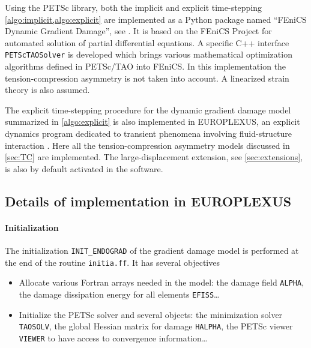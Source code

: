 Using the PETSc library, both the implicit and explicit time-stepping \cref{algo:implicit,algo:explicit} are implemented as a Python package named ``FEniCS Dynamic Gradient Damage'', see \cite{LiMaurini:2015}. It is based on the FEniCS Project \cite{LoggMardalWells:2012} for automated solution of partial differential equations. A specific C++ interface \texttt{PETScTAOSolver} is developed which brings various mathematical optimization algorithms defined in PETSc/TAO into FEniCS. In this implementation the tension-compression asymmetry is not taken into account. A linearized strain theory is also assumed.

The explicit time-stepping procedure for the dynamic gradient damage model summarized in \cref{algo:explicit} is also implemented in EUROPLEXUS, an explicit dynamics program dedicated to transient phenomena involving fluid-structure interaction \cite{EPX:2015}. Here all the tension-compression asymmetry models discussed in \cref{sec:TC} are implemented. The large-displacement extension, see \cref{sec:extensions}, is also by default activated in the software.

\subsection{Details of implementation in EUROPLEXUS}

\paragraph{Initialization}
The initialization \texttt{INIT\_ENDOGRAD} of the gradient damage model is performed at the end of the routine \texttt{initia.ff}. It has several objectives
\begin{itemize}
\item Allocate various Fortran arrays needed in the model: the damage field \texttt{ALPHA}, the damage dissipation energy for all elements \texttt{EFISS}\ldots

\item Initialize the PETSc solver and several objects: the minimization solver \texttt{TAOSOLV}, the global Hessian matrix for damage \texttt{HALPHA}, the PETSc viewer \texttt{VIEWER} to have access to convergence information\ldots
\end{itemize}

